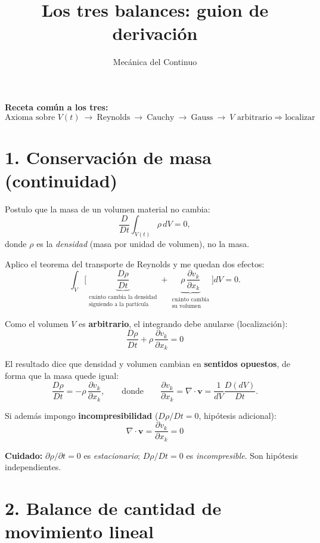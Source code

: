 \documentclass[11pt,a4paper]{article}
\title{Los tres balances: guion de derivación}
\author{Mecánica del Continuo}
\date{}
\begin{document}
\maketitle

\noindent\textbf{Receta común a los tres:}
\[
\text{Axioma sobre } V(t)
\ \longrightarrow\ \text{Reynolds}
\ \longrightarrow\ \text{Cauchy}
\ \longrightarrow\ \text{Gauss}
\ \longrightarrow\ V \text{ arbitrario} \Rightarrow \text{localizar}
\]

\vspace{1em}

\section*{1. Conservación de masa (continuidad)}

Postulo que la masa de un volumen material no cambia:
\[
\frac{D}{Dt}\int_{V(t)}\rho\,dV=0 ,
\]
donde $\rho$ es la \emph{densidad} (masa por unidad de volumen), no la masa.

Aplico el teorema del transporte de Reynolds y me quedan dos efectos:
\[
\int_{V}\Big[\underbrace{\frac{D\rho}{Dt}}_{\substack{\text{cuánto cambia la densidad}\\ \text{siguiendo a la partícula}}}
+\underbrace{\rho\,\frac{\partial v_k}{\partial x_k}}_{\substack{\text{cuánto cambia}\\ \text{su volumen}}}\Big]dV=0 .
\]

Como el volumen $V$ es \textbf{arbitrario}, el integrando debe anularse (localización):
\[
\boxed{\ \frac{D\rho}{Dt}+\rho\,\frac{\partial v_k}{\partial x_k}=0\ }
\]

El resultado dice que densidad y volumen cambian en \textbf{sentidos opuestos}, de forma
que la masa quede igual:
\[
\frac{D\rho}{Dt}=-\rho\,\frac{\partial v_k}{\partial x_k},
\qquad\text{donde}\qquad
\frac{\partial v_k}{\partial x_k}=\nabla\cdot\boldsymbol v=\frac{1}{dV}\frac{D(dV)}{Dt}.
\]

Si además impongo \textbf{incompresibilidad} ($D\rho/Dt=0$, hipótesis adicional):
\[
\boxed{\ \nabla\cdot\boldsymbol v=\frac{\partial v_k}{\partial x_k}=0\ }
\]

\medskip
\noindent\textbf{Cuidado:} $\partial\rho/\partial t=0$ es \emph{estacionario};
$D\rho/Dt=0$ es \emph{incompresible}. Son hipótesis independientes.

\section*{2. Balance de cantidad de movimiento lineal}
\end{document}
